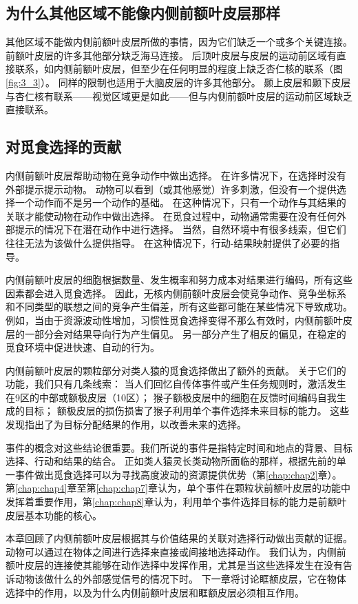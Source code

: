 \subsection{为什么其他区域不能像内侧前额叶皮层那样}

其他区域不能做内侧前额叶皮层所做的事情，因为它们缺乏一个或多个关键连接。
前额叶皮层的许多其他部分缺乏海马连接。
后顶叶皮层与皮层的运动前区域有直接联系，如内侧前额叶皮层，但至少在任何明显的程度上缺乏杏仁核的联系（图\ref{fig:3_3}）。
同样的限制也适用于大脑皮层的许多其他部分。
颞上皮层和颞下皮层与杏仁核有联系——视觉区域更是如此——但与内侧前额叶皮层的运动前区域缺乏直接联系。\par



\subsection{对觅食选择的贡献}

内侧前额叶皮层帮助动物在竞争动作中做出选择。
在许多情况下，在选择时没有外部提示提示动物。
动物可以看到（或其他感觉）许多刺激，但没有一个提供选择一个动作而不是另一个动作的基础。
在这种情况下，只有一个动作与其结果的关联才能使动物在动作中做出选择。
在觅食过程中，动物通常需要在没有任何外部提示的情况下在潜在动作中进行选择。
当然，自然环境中有很多线索，但它们往往无法为该做什么提供指导。
在这种情况下，行动-结果映射提供了必要的指导。\par


内侧前额叶皮层的细胞根据数量、发生概率和努力成本对结果进行编码，所有这些因素都会进入觅食选择。
因此，无核内侧前额叶皮层会使竞争动作、竞争坐标系和不同类型的联想之间的竞争产生偏差，所有这些都可能在某些情况下导致成功。
例如，当由于资源波动性增加，习惯性觅食选择变得不那么有效时，内侧前额叶皮层的一部分会对结果导向行为产生偏见。
另一部分产生了相反的偏见，在稳定的觅食环境中促进快速、自动的行为。\par


内侧前额叶皮层的颗粒部分对类人猿的觅食选择做出了额外的贡献。
关于它们的功能，我们只有几条线索：
当人们回忆自传体事件或产生任务规则时，激活发生在9区的中部或额极皮层（10区）；
猴子额极皮层中的细胞在反馈时间编码自我生成的目标；
额极皮层的损伤损害了猴子利用单个事件选择未来目标的能力。
这些发现指出了为目标分配结果的作用，以改善未来的选择\cite{tsujimoto2011frontal}。\par
事件的概念对这些结论很重要。我们所说的事件是指特定时间和地点的背景、目标选择、行动和结果的结合。
正如类人猿灵长类动物所面临的那样，根据先前的单一事件做出觅食选择可以为寻找高度波动的资源提供优势（第\ref{chap:chap2}章）。
第\ref{chap:chap4}章至第\ref{chap:chap7}章认为，单个事件在颗粒状前额叶皮层的功能中发挥着重要作用，第\ref{chap:chap8}章认为，利用单个事件选择目标的能力是前额叶皮层基本功能的核心。\par
本章回顾了内侧前额叶皮层根据其与价值结果的关联对选择行动做出贡献的证据。
动物可以通过在物体之间进行选择来直接或间接地选择动作。
我们认为，内侧前额叶皮层的连接使其能够在动作选择中发挥作用，尤其是当这些选择发生在没有告诉动物该做什么的外部感觉信号的情况下时。
下一章将讨论眶额皮层，它在物体选择中的作用，以及为什么内侧前额叶皮层和眶额皮层必须相互作用。\par



